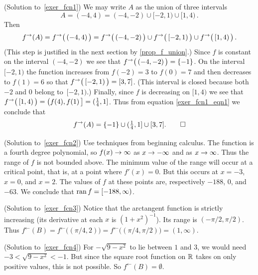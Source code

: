 \begin{prf}\label{sol_exer_fcn1}(Solution to~\ref{exer_fcn1})
We may write $A$ as the union of three intervals
 \[ A = (-4,4) = (-4,-2) \cup [-2,1) \cup [1,4)\,. \]
Then
 \begin{equation}\label{exer_fcn1_eqn1}
     f^{\rightarrow}(A) = f^{\rightarrow}\bigl(\,(-4,4)\,\bigr)\\
                 = f^{\rightarrow}\bigl(\,(-4,-2)\,\bigr) \cup f^{\rightarrow}\bigl(\,[-2,1)\,\bigr)
                           \cup f^{\rightarrow}\bigl(\,[1,4)\,\bigr)\,.
 \end{equation}
(This step is justified in the next section by \ref{prop_f_union}.) Since $f$ is constant on
the interval $(-4,-2)$ we see that $f^{\rightarrow}\bigl(\,(-4,-2)\,\bigr) = \{-1\}$.  On the
interval $[-2,1)$ the function increases from $f(-2) = 3$ to $f(0) = 7$ and then decreases to
$f(1) = 6$ so that $f^{\rightarrow}\bigl(\,[-2,1)\,\bigr) = [3,7]$.  (This interval is closed because
both $-2$ and $0$ belong to~$[-2,1)$.) Finally, since $f$ is decreasing on $[1,4)$ we see that
$f^{\rightarrow}\bigl(\,[1,4)\,\bigr) = \bigl(f(4),f(1)\,\bigr] = (\frac14,1]$.  Thus from equation
\eqref{exer_fcn1_eqn1} we conclude that
     \[f^{\rightarrow}(A) = \{-1\} \cup (\tfrac14,1] \cup [3,7]. \qedhere \]
\end{prf}

\begin{prf}\label{sol_exer_fcn2}(Solution to~\ref{exer_fcn2})
Use techniques from beginning calculus. The function is a fourth degree polynomial, so $f(x)
\rightarrow \infty$ as $x \rightarrow -\infty$ and as $x \rightarrow \infty$.  Thus the range of $f$ is not bounded
above. The minimum value of the range will occur at a critical point, that is, at a point
where $f'(x) = 0$.  But this occurs at $x = -3$, $x = 0$, and $x = 2$. The values of $f$ at
these points are, respectively $-188$, $0$, and $-63$.  We conclude that $\operatorname{ran} f = [-188,\infty)$.
\end{prf}

\begin{prf}\label{sol_exer_fcn3}(Solution to~\ref{exer_fcn3})
Notice that the arctangent function is strictly increasing (its derivative at each $x$ is $(1
+ x^2)^{-1}$).  Its range is $(-\pi/2,\pi/2)$.  Thus $f^{\gets}(B) =
f^{\gets}\bigl((\pi/4,2)\bigr) = f^{\gets}\bigl((\pi/4,\pi/2)\bigr) = (1, \infty)$.
\end{prf}

\begin{prf}\label{sol_exer_fcn4}(Solution to~\ref{exer_fcn4})
For $-\sqrt{9 - x^2}$ to lie between $1$ and $3$, we would need $-3 < \sqrt{9 - x^2} < -1$.
But since the square root function on $\mathbb{R}$ takes on only positive values, this is not
possible.  So $f^{\gets}(B) = \emptyset$.
\end{prf}

